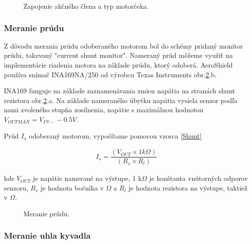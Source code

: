 \begin{figure}[!tbh]
	\hfill
	\hfill
	\hfill
	\caption{Zapojenie akčného člena a typ motorčeka.}\label{OBRAZOK 2.3}
\end{figure}


\subsubsection{Meranie prúdu}
\label{merprud}

Z dôvodu merania prúdu odoberaného motorom bol do schémy pridaný monitor prúdu, takzvaný "current shunt monitor". Nameraný prúd môžeme využiť na implementácie riadenia motora na základe prúdu, ktorý odoberá. AeroShield používa snímač INA169NA/250 od výrobcu Texas Instruments obr.\ref{OBRAZOK 2.3.2}.b.

INA169 funguje na základe zaznamenávania zmien napätia na stranách shunt rezistora obr.\ref{OBRAZOK 2.3.2}.a. Na základe nameraného úbytku napätia vysiela senzor podľa nami zvoleného stupňa zosilnenia, napätie s maximálnou hodnotou $V_{OUTMAX} = V_{IN-} - 0.5 V $.

Prúd $I_{s}$ odoberaný motorom, vypočítame pomocou vzorca \ref{Shunt}

\begin{align}
	\label{Shunt}
 I_{s} = \dfrac{(V_{OUT} \times  1 k\Omega)}{(R_{s} \times R_{l})}
\end{align}

kde $V_{OUT}$ je napätie namerané na výstupe, 1 k$\Omega$ je konštanta vnútorných odporov senzoru, $R_{s}$ je hodnota bočníka v $\Omega$ a $R_{l}$ je hodnota rezistora na výstupe, taktiež v $\Omega$\cite{INA}.

\begin{figure}[!tbh]
	\hfill
	\hfill
	\hfill
	\caption{Meranie prúdu.}\label{OBRAZOK 2.3.2}
\end{figure}


\subsubsection{Meranie uhla kyvadla}
\label{meruhl}


